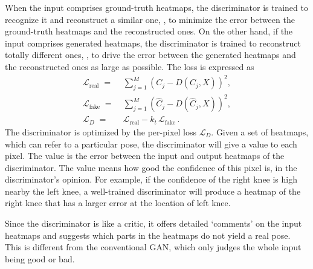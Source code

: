 \documentclass[10pt,twocolumn,letterpaper]{article}
\begin{document}
When the input comprises ground-truth heatmaps, the discriminator is trained to recognize it and reconstruct a similar one, \ie, to minimize the error between the ground-truth heatmaps and the reconstructed ones. On the other hand, if the input comprises generated heatmaps, the discriminator is trained to reconstruct totally different ones, \ie, to drive the error between the generated heatmaps and the reconstructed ones as large as possible. The loss is expressed as 
\begin{equation}
	\begin{aligned}	
		\mathcal{L}_{\mathrm{real}}\;=&\; \sum\limits_{j=1}^M (C_{j}-D(C_{j}, X))^2, \\
        \mathcal{L}_{\mathrm{fake}}\;=&\;\sum\limits_{j=1}^M (\hat{C}_{j}-D(\hat{C}_{j}, X))^2,\\
        \mathcal{L}_{D}\;=&\;\mathcal{L}_{\mathrm{real}}-k_{t}\,\mathcal{L}_{\mathrm{fake}}\,.
	\end{aligned}
    \label{D_loss}
\end{equation}
The discriminator is optimized by the per-pixel loss $\mathcal{L}_{D}$. Given a set of heatmaps, which can refer to a particular pose, the discriminator will give a value to each pixel. The value is the error between the input and output heatmaps of the discriminator. The value means how good the confidence of this pixel is, in the discriminator's opinion. 
For example, if the confidence of the right knee is high nearby the left knee, a well-trained discriminator will produce a heatmap of the right knee that has a larger error at the location of left knee. 

Since the discriminator is like a critic, it offers detailed `comments' on the input heatmaps and suggests which parts in the heatmaps do not yield a real pose. This is different from the conventional GAN, which only judges the whole input being good or bad.  
\end{document}
